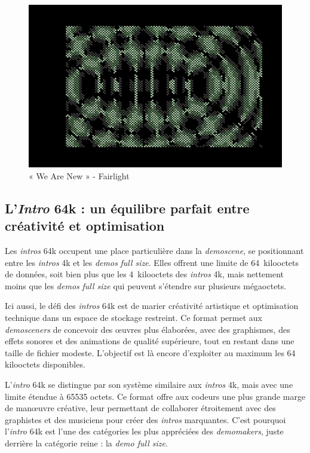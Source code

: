 \begin{figure}[h]
  \hfill
  \begin{minipage}[b]{0.30\linewidth}
    \centering
    \includegraphics[width=\linewidth]{images/demoscene/demos/wnew3.png}
  \end{minipage}
  \caption{« We Are New » - Fairlight}
  \label{wnew}
\end{figure}


\subsection*{L'\textit{Intro} 64k : un équilibre parfait entre créativité et optimisation}
Les \textit{intros} 64k occupent une place particulière dans la \textit{demoscene}, se positionnant entre les \textit{intros} 4k et les \textit{demos} \textit{full size}. Elles offrent une limite de 64~kilooctets de données, soit bien plus que les 4~kilooctets des \textit{intros} 4k, mais nettement moins que les \textit{demos} \textit{full size} qui peuvent s'étendre sur plusieurs mégaoctets.

Ici aussi, le défi des \textit{intros} 64k est de marier créativité artistique et optimisation technique dans un espace de stockage restreint. Ce format permet aux \textit{demosceners} de concevoir des œuvres plus élaborées, avec des graphismes, des effets sonores et des animations de qualité supérieure, tout en restant dans une taille de fichier modeste. L'objectif est là encore d'exploiter au maximum les 64 kilooctets disponibles.

L'\textit{intro} 64k se distingue par son système similaire aux \textit{intros} 4k, mais avec une limite étendue à 65535 octets. Ce format offre aux codeurs une plus grande marge de manœuvre créative, leur permettant de collaborer étroitement avec des graphistes et des musiciens pour créer des \textit{intros} marquantes. C'est pourquoi l'\textit{intro} 64k est l'une des catégories les plus appréciées des \textit{demomakers}, juste derrière la catégorie reine : la \textit{demo full size}.

